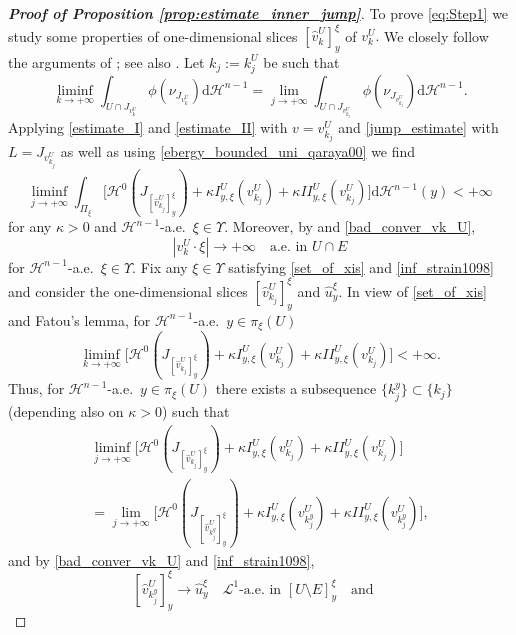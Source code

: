 \documentclass[reqno]{amsart}
\numberwithin{equation}{section}
\theoremstyle{plain}
\theoremstyle{definition}
\newcommand{\cH}{\mathcal{H}}
\newcommand{\cL}{\mathcal{L}}
\renewcommand{\d}{\mathrm{d}}
\renewcommand{\hat}{\widehat}
\begin{document}
\begin{proof}[\textbf{Proof of Proposition \ref{prop:estimate_inner_jump}}]
To prove \eqref{eq:Step1} we study some properties of one-dimensional slices $[\hat v_k^U]_y^\xi$ of $v_k^U.$ We closely follow the arguments of \cite[pp. 11-13]{ChC:2020_jems}; see also \cite{ChC:2020_arxiv}. Let $k_j:=k_j^U$ be such that  
\begin{equation*}
\liminf\limits_{k\to+\infty} \int_{U\cap J_{v_k^U}} \phi(\nu_{J_{v_k^U}}^{})\d\cH^{n-1} = \lim\limits_{j\to+\infty} \int_{U\cap J_{v_{k_j}^U}} \phi(\nu_{J_{v_{k_j}^U}}^{})\d\cH^{n-1}.
\end{equation*}
%
Applying \eqref{estimate_I} and \eqref{estimate_II} with $v=v_{k_j}^U$ and \eqref{jump_estimate} with $L =J_{v_{k_j}^U}$ as well as using  \eqref{ebergy_bounded_uni_qaraya00}
we find 
\begin{equation}
\liminf\limits_{j\to+\infty} \int_{\Pi_\xi} \Big[\cH^0(J_{[\hat v_{k_j}^U]_y^\xi}) + \kappa I_{y,\xi}^U(v_{k_j}^U) + \kappa II_{y,\xi}^U(v_{k_j}^U) \Big]\d\cH^{n-1}(y) <+\infty 
\label{set_of_xis} 
\end{equation}
%
for any $\kappa>0$ and $\cH^{n-1}$-a.e.\  $\xi\in\Upsilon.$  
%
Moreover, by \cite[Lemma 2.7]{ChC:2020_jems} and \eqref{bad_conver_vk_U},
%
\begin{equation}\label{inf_strain1098}
|v_k^U\cdot\xi| \to+\infty\quad\text{a.e.\  in $U\cap E$} 
\end{equation}
for $\cH^{n-1}$-a.e.\  $\xi\in\Upsilon.$  
Fix any $\xi\in\Upsilon$ satisfying \eqref{set_of_xis} and \eqref{inf_strain1098} and consider the one-dimensional slices $[\hat v_{k_j}^U]_y^\xi$ and $\hat u_y^\xi.$ 
In view of \eqref{set_of_xis} and  Fatou's lemma, for $\cH^{n-1}$-a.e.\  $y\in \pi_\xi(U)$  
$$
\liminf\limits_{k\to+\infty} \Big[\cH^0(J_{[\hat v_{k_j}^U]_y^\xi}) + \kappa I_{y,\xi}^U(v_{k_j}^U) +\kappa  II_{y,\xi}^U(v_{k_j}^U) \Big] < +\infty.
$$
Thus, for $\cH^{n-1}$-a.e.\  $y\in \pi_\xi(U)$ there exists a subsequence $\{k_j^y\}\subset\{k_j\}$ (depending also on $\kappa>0$) such that 
%
\begin{multline}
\liminf\limits_{j\to+\infty} \Big[\cH^0(J_{[\hat v_{k_j}^U]_y^\xi}) + \kappa I_{y,\xi}^U(v_{k_j}^U) + \kappa II_{y,\xi}^U(v_{k_j}^U) \Big] \\
= \lim\limits_{j\to+\infty} \Big[\cH^0(J_{[\hat v_{k_j^y}^U]_y^\xi}) + \kappa I_{y,\xi}^U(v_{k_j^y}^U) + \kappa II_{y,\xi}^U(v_{k_j^y}^U) \Big], \label{mana_liminf_ana_liminf} 
\end{multline}
% 
and by \eqref{bad_conver_vk_U} and \eqref{inf_strain1098},
%
\begin{equation} \label{conv_one_dim_slices}
[\hat v_{k_j^y}^U]_y^\xi \to \hat u_y^\xi\quad\text{$\cL^1$-a.e.\  in $[U\setminus E]_y^\xi$}\quad \text{and}\quad

\end{equation}
\end{proof}
\end{document}
